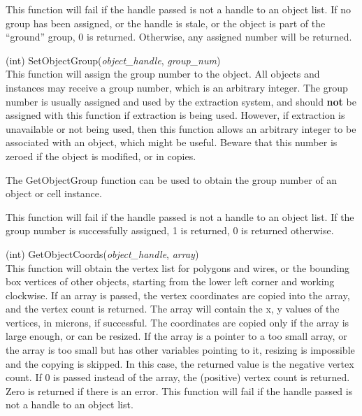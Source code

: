 \begin{description}
This function will fail if the handle passed is not a handle to an
object list.  If no group has been assigned, or the handle is stale,
or the object is part of the ``ground'' group, 0 is returned. 
Otherwise, any assigned number will be returned. 

\item{(int) \vt SetObjectGroup({\it object\_handle\/}, {\it group\_num\/})}\\
This function will assign the group number to the object.  All objects
and instances may receive a group number, which is an arbitrary
integer.  The group number is usually assigned and used by the
extraction system, and should {\bf not} be assigned with this function
if extraction is being used.  However, if extraction is unavailable or
not being used, then this function allows an arbitrary integer to be
associated with an object, which might be useful.  Beware that this
number is zeroed if the object is modified, or in copies.

The {\vt GetObjectGroup} function can be used to obtain the group
number of an object or cell instance.

This function will fail if the handle passed is not a handle to an
object list.  If the group number is successfully assigned, 1 is
returned, 0 is returned otherwise.

\item{(int) \vt GetObjectCoords({\it object\_handle\/}, {\it array\/})}\\
This function will obtain the vertex list for polygons and wires, or
the bounding box vertices of other objects, starting from the lower
left corner and working clockwise.  If an array is passed, the vertex
coordinates are copied into the array, and the vertex count is
returned.  The array will contain the x, y values of the vertices, in
microns, if successful.  The coordinates are copied only if the array
is large enough, or can be resized.  If the array is a pointer to a
too small array, or the array is too small but has other variables
pointing to it, resizing is impossible and the copying is skipped.  In
this case, the returned value is the negative vertex count.  If 0 is
passed instead of the array, the (positive) vertex count is returned. 
Zero is returned if there is an error.  This function will fail if the
handle passed is not a handle to an object list.


\end{description}
